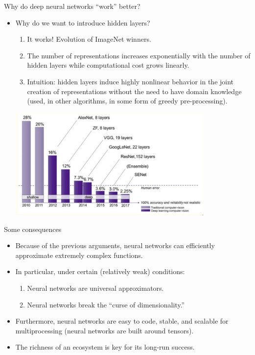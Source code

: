 \documentclass[notes, ignorenonframetext, compress, 10pt, xcolor=svgnames, aspectratio=169]{beamer}
\begin{document}
\begin{frame}[allowframebreaks]{Why do deep neural networks “work” better?}
\begin{itemize}
  \item Why do we want to introduce hidden layers?
  \begin{enumerate}
  \item It works! Evolution of ImageNet winners.
  \item The number of representations increases
   exponentially with the number of hidden layers while
    computational cost grows linearly.
  \item Intuition: hidden layers induce highly nonlinear 
  behavior in the joint creation of representations without 
  the need to have domain knowledge (used, in other algorithms, 
  in some form of greedy pre-processing).
  \end{enumerate}

  \framebreak 

\begin{center}
  \includegraphics[width=0.8\textwidth]{../../Ressources/Figs/Fig_AccuracyNetsVision.png}\\
 \end{center}


\end{itemize}
\end{frame}


\begin{frame}[allowframebreaks]{Some consequences}
\begin{itemize}
  
  \item Because of the previous arguments, neural networks 
  can efficiently approximate extremely complex functions.
  \item In particular, under certain (relatively weak) conditions:
  \begin{enumerate}
  \item Neural networks are universal approximators.
  \item Neural networks break the “curse of dimensionality.”
  \end{enumerate}
  \item Furthermore, neural networks are easy to code, stable, 
  and scalable for multiprocessing (neural networks are built around tensors).
  \item The richness of an ecosystem is key for its long-run success.

\end{itemize}

\end{frame}
\end{document}
